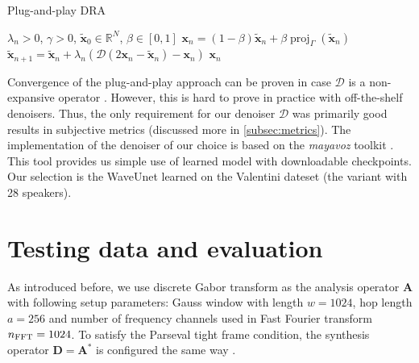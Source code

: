 \documentclass[conference]{IEEEtran}
\begin{document}
\vspace{-1.5ex} 
\begin{algorithm}
	\caption{Plug-and-play DRA}
	\begin{algorithmic}[1]\label{alg:pnp}
		\renewcommand{\algorithmicrequire}{\textbf{Input:}}
		\renewcommand{\algorithmicensure}{\textbf{Output:}}
		\REQUIRE $ \lambda_n > 0 $, $ \gamma>0 $, $ \mathbf{\widetilde{x}}_0 \in \mathbb{R}^{N} $, $\beta \in [0, 1]$
		\STATE %
		$\mathbf{x}_n= (1-\beta)\mathbf{\widetilde{x}}_n + \beta \operatorname{proj}_{\Gamma}(\mathbf{\widetilde{x}}_n) $ 
		\STATE $ \mathbf{\widetilde{x}}_{n+1} = \mathbf{\widetilde{x}}_n + \lambda_n \left( \mathcal{D} \left(2\mathbf{x}_n-\mathbf{\widetilde{x}}_n \right)-\mathbf{x}_n\right)$
		\ENDFOR
		\RETURN $\mathbf{x}_n$ 
	\end{algorithmic} 
\end{algorithm}
\vspace{-1.5ex} 


Convergence of the plug-and-play approach can be proven in case $\mathcal{D}$ is a non-expansive operator \cite{Chan2016}.
However, this is hard to prove in practice with off-the-shelf denoisers.
Thus, the only requirement for our denoiser $\mathcal{D}$ was primarily good results in subjective metrics
(discussed more in \ref{subsec:metrics}).
The implementation of the denoiser of our choice is based on the \textit{mayavoz} toolkit \cite{Shahul2023}.
This tool provides us simple use of learned model with downloadable checkpoints.
Our selection is the WaveUnet learned on the Valentini dateset \cite{ValentiniBotinhao2017} (the variant with 28 speakers).

\section{Testing data and evaluation}\label{sec:eval}

As introduced before, we use discrete Gabor transform as the analysis operator $\mathbf{A}$ with following setup parameters: Gauss window with length $w =1024 $, hop length $a = 256$ and number of frequency channels used in Fast Fourier transform %
$n_{\textup{FFT}} = 1024$.
To satisfy the Parseval tight frame condition, the synthesis operator $\mathbf{D} = \mathbf{A}^*$ is configured the same way \cite{Mokry2020}.
\end{document}
